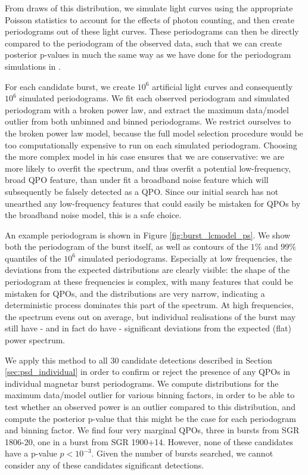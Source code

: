 \documentclass[numberedappendix]{emulateapj}
\begin{document}
From draws of this distribution, we simulate light curves using the appropriate Poisson statistics to account for the effects of photon counting, and then create periodograms out of these light curves. These periodograms can then be directly compared to the periodogram of the observed data, such that we can create posterior p-values in much the same way as we have done for the periodogram simulations in \citep{huppenkothen2013}. 

For each candidate burst, we create $10^6$ artificial light curves and consequently $10^6$ simulated periodograms. We fit each observed periodogram and simulated periodogram with a broken power law, and extract the maximum data/model outlier from both unbinned and binned periodograms. We restrict ourselves to the broken power law model, because the full model selection procedure would be too computationally expensive to run on each simulated periodogram. Choosing the more complex model in his case ensures that we are conservative: we are more likely to overfit the spectrum, and thus overfit a potential low-frequency, broad QPO feature, than under fit a broadband noise feature which will subsequently be falsely detected as a QPO. Since our initial search has not unearthed any low-frequency features that could easily be mistaken for QPOs by the broadband noise model, this is a safe choice.

An example periodogram is shown in Figure \ref{fig:burst_lcmodel_ps}. We show both the periodogram of the burst itself, as well as contours of the $1\%$ and $99\%$ quantiles of the $10^6$ simulated periodograms. Especially at low frequencies, the deviations from the expected distributions are clearly visible: the shape of the periodogram at these frequencies is complex, with many features that could be mistaken for QPOs, and the distributions are very narrow, indicating a deterministic process dominates this part of the spectrum. At high frequencies, the spectrum evens out on average, but individual realisations of the burst may still have - and in fact do have - significant deviations from the expected (flat) power spectrum.

We apply this method to all $30$ candidate detections described in Section \ref{sec:psd_individual} in order to confirm or reject the presence of any QPOs in individual magnetar burst periodograms. We compute distributions for the maximum data/model outlier for various binning factors, in order to be able to test whether an observed power is an outlier compared to this distribution, and compute the posterior p-value that this might be the case for each periodogram and binning factor. 
We find four very marginal QPOs, three in bursts from SGR 1806-20, one in a burst from SGR 1900+14. However, none of these candidates have a p-value $p < 10^{-3}$. Given the number of bursts searched, we cannot consider any of these candidates significant detections.
\end{document}
